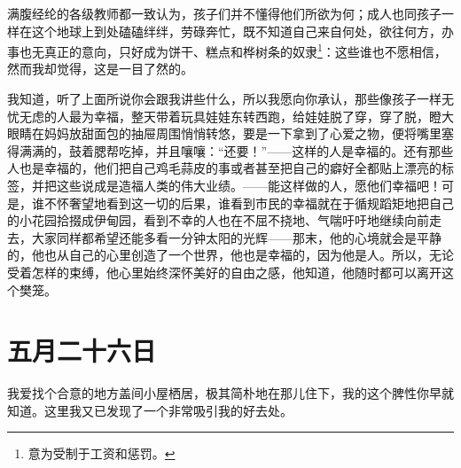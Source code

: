 \documentclass[12pt,oneside]{book}
\begin{document}
满腹经纶的各级教师都一致认为，孩子们并不懂得他们所欲为何；成人也同孩子一样在这个地球上到处磕磕绊绊，劳碌奔忙，既不知道自己来自何处，欲往何方，办事也无真正的意向，只好成为饼干、糕点和桦树条的奴隶\footnote{意为受制于工资和惩罚。}：这些谁也不愿相信，然而我却觉得，这是一目了然的。

我知道，听了上面所说你会跟我讲些什么，所以我愿向你承认，那些像孩子一样无忧无虑的人最为幸福，整天带着玩具娃娃东转西跑，给娃娃脱了穿，穿了脱，瞪大眼睛在妈妈放甜面包的抽屉周围悄悄转悠，要是一下拿到了心爱之物，便将嘴里塞得满满的，鼓着腮帮吃掉，并且嚷嚷：“还要！”——这样的人是幸福的。还有那些人也是幸福的，他们把自己鸡毛蒜皮的事或者甚至把自己的癖好全都贴上漂亮的标签，并把这些说成是造福人类的伟大业绩。——能这样做的人，愿他们幸福吧！可是，谁不怀奢望地看到这一切的后果，谁看到市民的幸福就在于循规蹈矩地把自己的小花园拾掇成伊甸园，看到不幸的人也在不屈不挠地、气喘吁吁地继续向前走去，大家同样都希望还能多看一分钟太阳的光辉——那末，他的心境就会是平静的，他也从自己的心里创造了一个世界，他也是幸福的，因为他是人。所以，无论受着怎样的束缚，他心里始终深怀美好的自由之感，他知道，他随时都可以离开这个樊笼。


\chapter{五月二十六日}
\label{sec-2-8}
我爱找个合意的地方盖间小屋栖居，极其简朴地在那儿住下，我的这个脾性你早就知道。这里我又已发现了一个非常吸引我的好去处。
\end{document}
